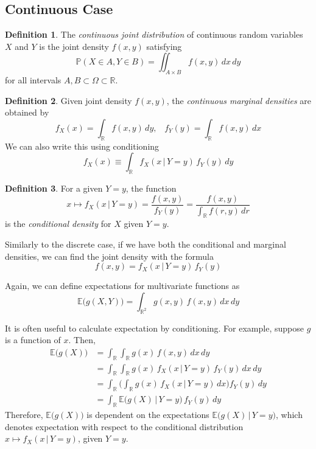 \documentclass{article}
\theoremstyle{remark}
\theoremstyle{definition}
\newtheorem{definition}{Definition}[section]
\begin{document}
\subsection{Continuous Case}
\begin{definition}
The \textit{continuous joint distribution} of continuous random variables $X$ and $Y$ is the joint density $f(x, y)$ satisfying
\[\mathbb{P}(X \in A, Y \in B) = \iint_{A \times B} f(x, y)\, dx\,dy\]
for all intervals $A, B \subset \Omega \subset \mathbb{R}$.
\end{definition}

\begin{definition}
Given joint density $f(x, y)$, the \textit{continuous marginal densities} are obtained by 
\[f_X (x) = \int_\mathbb{R} f(x, y) \, dy,  \;\;\; f_Y (y) = \int_\mathbb{R} f(x, y) \, dx\]
We can also write this using conditioning 
\[f_X (x) \equiv \int_\mathbb{R} f_X (x \, | \, Y = y) \, f_Y (y) \, dy\]
\end{definition}

\begin{definition}
For a given $Y = y$, the function 
\[x \mapsto f_X (x \, | \, Y = y) = \frac{f(x, y)}{f_Y (y)} = \frac{f(x, y)}{\int_\mathbb{R} f(r, y) \, dr}\]
is the \textit{conditional density} for $X$ given $Y = y$. 

Similarly to the discrete case, if we have both the conditional and marginal densities, we can find the joint density with the formula
\[f(x, y) = f_X (x \, | \, Y = y) \, f_Y (y)\]
\end{definition}

Again, we can define expectations for multivariate functions as
\[\mathbb{E}\big( g(X, Y) \big) = \int_{\mathbb{R}^2} g(x, y) \, f(x, y) \, dx\,dy\]

It is often useful to calculate expectation by conditioning. For example, suppose $g$ is a function of $x$. Then, 
\begin{align*}
    \mathbb{E}\big(g(X)\big) & = \int_\mathbb{R} \int_\mathbb{R} g(x) \, f(x, y) \, dx\,dy \\
    & = \int_\mathbb{R} \int_\mathbb{R} g(x) \, f_X (x \, | \, Y = y) \, f_Y (y) \,dx \,dy\\
    & = \int_\mathbb{R} \bigg( \int_\mathbb{R} g(x) \, f_X (x \, |\, Y =y) \, dx \bigg) f_Y (y) \, dy \\
    & = \int_\mathbb{R} \mathbb{E}\big( g(X) \,|\, Y = y\big) \, f_Y(y) \, dy
\end{align*}
Therefore, $\mathbb{E}\big( g(X)\big)$ is dependent on the expectations $\mathbb{E} \big( g(X) \, | \, Y = y\big)$, which denotes expectation with respect to the conditional distribution $x \mapsto f_X (x\,|\,Y = y)$, given $Y = y$. 
\end{document}
